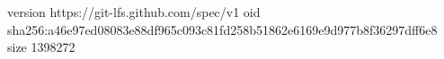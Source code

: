 version https://git-lfs.github.com/spec/v1
oid sha256:a46e97ed08083e88df965c093c81fd258b51862e6169e9d977b8f36297dff6e8
size 1398272
